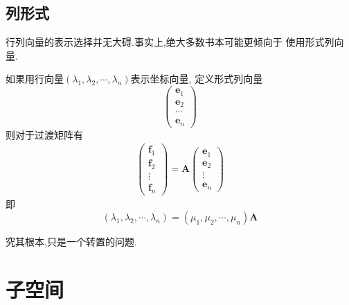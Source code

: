\subsection{列形式}
行列向量的表示选择并无大碍.事实上,绝大多数书本可能更倾向于
使用形式列向量.

如果用行向量$\left(\lambda_1,\lambda_2,\cdots,\lambda_n
\right)$表示坐标向量,
定义形式列向量
\[
\begin{pmatrix}
    \bm{e}_1 \\
    \bm{e}_2\\
    \cdots \\
    \bm{e}_n
\end{pmatrix}
\]
则对于过渡矩阵有
\begin{align*}
    \begin{pmatrix}
        \bm{f}_1\\\bm{f}_2\\\vdots\\\bm{f}_n
    \end{pmatrix}=
    \bm{A}\begin{pmatrix}
        \bm{e}_1\\\bm{e}_2\\\vdots\\\bm{e}_n
    \end{pmatrix}
\end{align*}
即\[
\left(\lambda _1,\lambda_2,\cdots,
\lambda _n\right)
 = \left(\mu_1,\mu_2,\cdots
 ,\mu_n\right)\bm{A}
\]

究其根本,只是一个转置的问题.
\newpage
\section{子空间}
